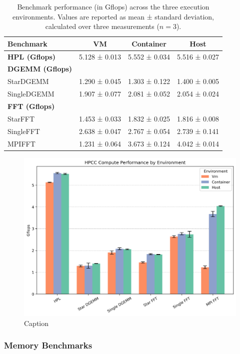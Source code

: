 \begin{table}[htbp]
\centering

\renewcommand{\arraystretch}{1.2}
\begin{tabular}{lccc}
\toprule
\textbf{Benchmark} & \textbf{VM} & \textbf{Container} & \textbf{Host} \\
\midrule
\textbf{HPL (Gflops)} & 5.128 ± 0.013 & 5.552 ± 0.034 & 5.516 ± 0.027 \\
\midrule
\textbf{DGEMM (Gflops)} & & & \\
StarDGEMM     & 1.290 ± 0.045 & 1.303 ± 0.122 & 1.400 ± 0.005 \\
SingleDGEMM   & 1.907 ± 0.077 & 2.081 ± 0.052 & 2.054 ± 0.024 \\
\midrule
\textbf{FFT (Gflops)} & & & \\
StarFFT      & 1.453 ± 0.033 & 1.832 ± 0.025 & 1.816 ± 0.008 \\
SingleFFT    & 2.638 ± 0.047 & 2.767 ± 0.054 & 2.739 ± 0.141 \\
MPIFFT       & 1.231 ± 0.064 & 3.673 ± 0.124 & 4.042 ± 0.014 \\
\bottomrule
\end{tabular}
\caption{Benchmark performance (in Gflops) across the three execution environments. Values are reported as mean ± standard deviation, calculated over three measurements ($n = 3$).}
\label{tab:benchmark_performance}
\end{table}

\begin{figure}[H]
    \centering
    \includegraphics[width=0.8\linewidth]{assets/hpcc_compute_performance.png}
    \caption{Caption}
    \label{fig:hpcc_compute_performance}
\end{figure}

\subsubsection{Memory Benchmarks}

